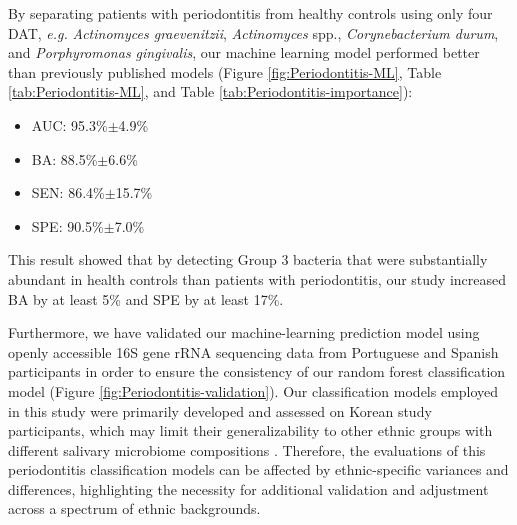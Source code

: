 \documentclass[11pt, a4paper, onecolumn, oneside]{report}
\begin{document}
            By separating patients with periodontitis from healthy controls using only four DAT, \textit{e.g.} \textit{Actinomyces graevenitzii}, \textit{Actinomyces} spp., \textit{Corynebacterium durum}, and \textit{Porphyromonas gingivalis}, our machine learning model performed better than previously published models (Figure \ref{fig:Periodontitis-ML}, Table \ref{tab:Periodontitis-ML}, and Table \ref{tab:Periodontitis-importance}):
            \begin{itemize}[noitemsep,nolistsep]
                \item AUC: 95.3\%$\pm$4.9\%
                \item BA: 88.5\%$\pm$6.6\%
                \item SEN: 86.4\%$\pm$15.7\%
                \item SPE: 90.5\%$\pm$7.0\%
            \end{itemize}

            This result showed that by detecting Group 3 bacteria that were substantially abundant in health controls than patients with periodontitis, our study increased BA by at least 5\% and SPE by at least 17\%.

            Furthermore, we have validated our machine-learning prediction model using openly accessible 16S gene rRNA sequencing data from Portuguese \cite{Periodontitis-10} and Spanish participants \cite{Periodontitis-Portuguese-1} in order to ensure the consistency of our random forest classification model (Figure \ref{fig:Periodontitis-validation}). Our classification models employed in this study were primarily developed and assessed on Korean study participants, which may limit their generalizability to other ethnic groups with different salivary microbiome compositions \cite{Periodontitis-ethnic-1, Periodontitis-ethnic-2}. Therefore, the evaluations of this periodontitis classification models can be affected by ethnic-specific variances and differences, highlighting the necessity for additional validation and adjustment across a spectrum of ethnic backgrounds.
\end{document}
